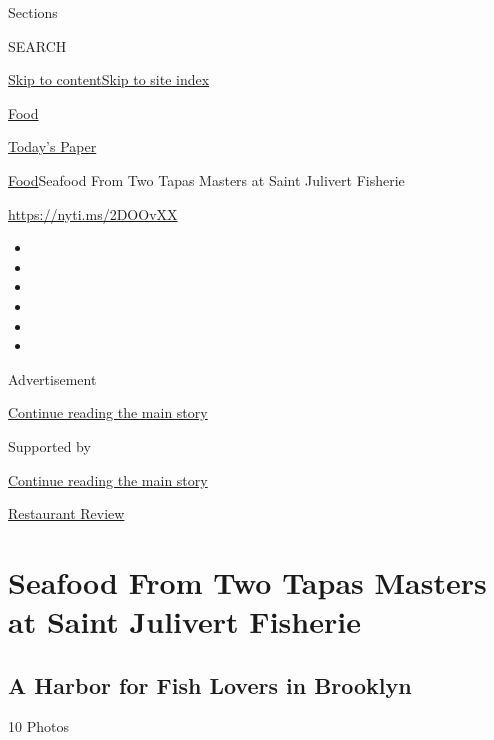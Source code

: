 Sections

SEARCH

\protect\hyperlink{site-content}{Skip to
content}\protect\hyperlink{site-index}{Skip to site index}

\href{https://www.nytimes3xbfgragh.onion/section/food}{Food}

\href{https://myaccount.nytimes3xbfgragh.onion/auth/login?response_type=cookie\&client_id=vi}{}

\href{https://www.nytimes3xbfgragh.onion/section/todayspaper}{Today's
Paper}

\href{/section/food}{Food}\textbar{}Seafood From Two Tapas Masters at
Saint Julivert Fisherie

\url{https://nyti.ms/2DOOvXX}

\begin{itemize}
\item
\item
\item
\item
\item
\item
\end{itemize}

Advertisement

\protect\hyperlink{after-top}{Continue reading the main story}

Supported by

\protect\hyperlink{after-sponsor}{Continue reading the main story}

\href{/column/restaurant-review}{Restaurant Review}

\hypertarget{seafood-from-two-tapas-masters-at-saint-julivert-fisherie}{%
\section{Seafood From Two Tapas Masters at Saint Julivert
Fisherie}\label{seafood-from-two-tapas-masters-at-saint-julivert-fisherie}}

\href{https://www.nytimes3xbfgragh.onion/slideshow/2018/11/27/dining/saint-julivert-fisherie-brooklyn.html}{}

\hypertarget{a-harbor-for-fish-lovers-in-brooklyn}{%
\subsection{A Harbor for Fish Lovers in
Brooklyn}\label{a-harbor-for-fish-lovers-in-brooklyn}}

10 Photos

